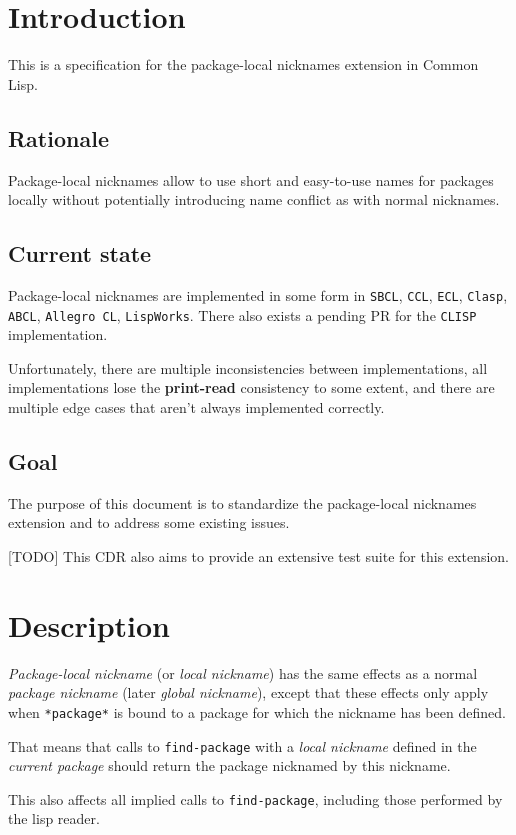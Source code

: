 \documentclass[11pt]{article}
\author{Grolter Bell}
\date{\today}
\title{}
\begin{document}
\section{Introduction}
\label{sec:orgb428c72}
This is a specification for the package-local nicknames extension in Common Lisp.
\subsection{Rationale}
\label{sec:org8ee42a4}
Package-local nicknames allow to use short and easy-to-use names for packages
locally without potentially introducing name conflict as with normal nicknames.
\subsection{Current state}
\label{sec:org6299332}
Package-local nicknames are implemented in some form in \texttt{SBCL}, \texttt{CCL}, \texttt{ECL},
\texttt{Clasp}, \texttt{ABCL}, \texttt{Allegro CL}, \texttt{LispWorks}. There also exists a pending PR for the
\texttt{CLISP} implementation.

Unfortunately, there are multiple inconsistencies between implementations, all
implementations lose the \textbf{print-read} consistency to some extent, and there are
multiple edge cases that aren't always implemented correctly.
\subsection{Goal}
\label{sec:org4810ec2}
The purpose of this document is to standardize the package-local nicknames
extension and to address some existing issues.

[TODO] This CDR also aims to provide an extensive test suite for this extension.
\section{Description}
\label{sec:orga1b49e2}
\emph{Package-local nickname} (or \emph{local nickname}) has the same effects as a
normal \emph{package nickname} (later \emph{global nickname}), except that these
effects only apply when \texttt{*package*} is bound to a package for which the
nickname has been defined.

That means that calls to \texttt{find-package} with a \emph{local nickname} defined in
the \emph{current package} should return the package nicknamed by this nickname.

This also affects all implied calls to \texttt{find-package}, including those
performed by the lisp reader.
\end{document}
